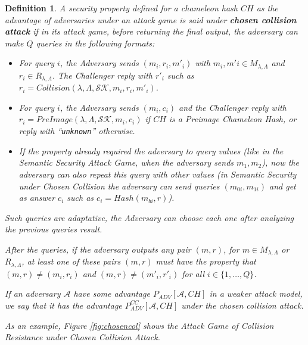 \documentclass[a4paper]{article}
\newtheorem{definicao}{Definition}
\begin{document}
 \begin{definicao}
 A security property defined for a chameleon hash $CH$ as the advantage of adversaries under an attack game is said under \textbf{chosen collision attack} if in its attack game, before returning the final output, the adversary can make $Q$ queries in the following formats:
 \begin{itemize}
     \item For query $i$, the Adversary sends $(m_i, r_i, m'_i)$ with $m_i, m'i \in M_{\lambda,\Lambda}$ and $r_i\in R_{\lambda,\Lambda}$. The Challenger reply with $r'_i$ such as $r_i = Collision(\lambda, \Lambda, \mathcal{SK}, m_i, r_i, m'_i)$.
     \item For query $i$, the Adversary sends $(m_i, c_i)$ and the Challenger reply with $r_i = PreImage(\lambda, \Lambda, \mathcal{SK}, m_i, c_i)$ if $CH$ is a Preimage Chameleon Hash, or reply with ``\texttt{unknown}'' otherwise.
     \item If the property already required the adversary to query values (like in the Semantic Security Attack Game, when the adversary sends $m_1, m_2$), now the adversary can also repeat this query with other values (in Semantic Security under Chosen Collision the adversary can send queries $(m_{0i}, m_{1i})$ and get as answer $c_i$ such as $c_i=Hash(m_{bi}, r)$).
     \end{itemize}
     
     Such queries are adaptative, the Adversary can choose each one after analyzing the previous queries result.
     
     After the queries, if the adversary outputs any pair $(m, r)$, for $m\in M_{\lambda,\Lambda}$ or $R_{\lambda, \Lambda}$, at least one of these pairs $(m, r)$ must have the property that $(m, r)\neq (m_i, r_i)$ and $(m, r)\neq(m'_i, r'_i)$ for all $i \in \{1, \ldots, Q\}$.

     If an adversary $\mathcal{A}$ have some advantage $P_{ADV}[\mathcal{A}, CH]$ in a weaker attack model, we say that it has the advantage $P_{ADV}^{CC}[\mathcal{A}, CH]$ under the chosen collision attack.
          
     As an example, Figure \ref{fig:chosencol} shows the Attack Game of Collision Resistance under Chosen Collision Attack.
     

\end{definicao}
\end{document}
